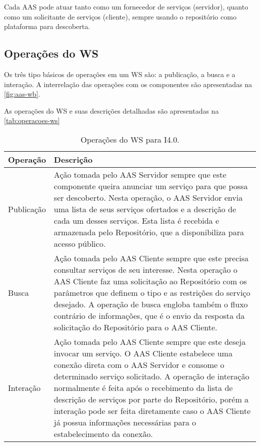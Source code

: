 	Cada AAS pode atuar tanto como um fornecedor de serviços (servidor), quanto como um solicitante de serviços (cliente), sempre usando o repositório como plataforma para descoberta.
	
	
\subsection{ Operações do WS }

	Os três tipo básicos de operações em um WS são: a publicação, a busca e a interação. A interrelação das operações com os componentes são apresentadas na \autoref{fig:aas-wb}.
	
	As operações do WS e suas descrições detalhadas são apresentadas na \autoref{tab:operacoes-ws}
	
	\begin{table}[htb]
		\centering
		\caption{Operações do WS para I4.0.}
		\label{tab:operacoes-ws}
		\begin{tabular}{p{3cm}p{12cm}}
			\hline
			\textbf{Operação}
			& \textbf{Descrição} \\ 
			
			\hline
			Publicação
			& Ação tomada pelo AAS Servidor sempre que este componente queira anunciar um serviço para que possa ser descoberto. Nesta operação, o AAS Servidor envia uma lista de seus serviços ofertados e a descrição de cada um desses serviços. Esta lista é recebida e armazenada pelo Repositório, que a disponibiliza para acesso público. \\
			
			\hline
			Busca
			& Ação tomada pelo AAS Cliente sempre que este precisa consultar serviços de seu interesse. Nesta operação o AAS Cliente faz uma solicitação ao Repositório com os parâmetros que definem o tipo e as restrições do serviço desejado. A operação de busca engloba também o fluxo contrário de informações, que é o envio da resposta da solicitação do Repositório para o AAS Cliente. \\
			
			\hline
			Interação
			& Ação tomada pelo AAS Cliente sempre que este deseja invocar um serviço. O AAS Cliente estabelece uma conexão direta com o AAS Servidor e consome o determinado serviço solicitado. A operação de interação normalmente é feita após o recebimento da lista de descrição de serviços por parte do Repositório, porém a interação pode ser feita diretamente caso o AAS Cliente já possua informações necessárias para o estabelecimento da conexão.  \\
			
			\hline
		\end{tabular}
	\end{table}
	
